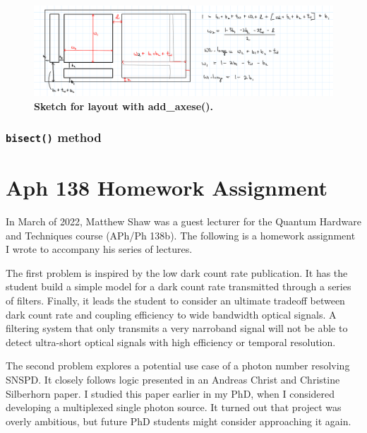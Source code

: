 \documentclass[11pt]{caltech_thesis} %
\begin{document}
\hypertarget{fig:layout_sketch}{%
\begin{figure}
\centering
\includegraphics{chapter_05/figs_05/layout_sketch.png}
\caption[{Rough sketch for layout with add\_axese()}]{\textbf{Sketch for
layout with add\_axese().}}
\label{fig:layout_sketch}
\end{figure}
}

\hypertarget{bisect-method}{%
\subsubsection{\texorpdfstring{\texttt{bisect()}
method}{bisect() method}}\label{bisect-method}}

\hypertarget{aph-138-homework-assignment}{%
\section{Aph 138 Homework
Assignment}\label{aph-138-homework-assignment}}

In March of 2022, Matthew Shaw was a guest lecturer for the Quantum
Hardware and Techniques course (APh/Ph 138b). The following is a
homework assignment I wrote to accompany his series of lectures.

The first problem is inspired by the low dark count rate
publication\autocite{Mueller:21}. It has the student build a simple
model for a dark count rate transmitted through a series of filters.
Finally, it leads the student to consider an ultimate tradeoff between
dark count rate and coupling efficiency to wide bandwidth optical
signals. A filtering system that only transmits a very narroband signal
will not be able to detect ultra-short optical signals with high
efficiency or temporal resolution.

The second problem explores a potential use case of a photon number
resolving SNSPD. It closely follows logic presented in an Andreas Christ
and Christine Silberhorn paper\autocite{Andreas:12}. I studied this
paper earlier in my PhD, when I considered developing a multiplexed
single photon source. It turned out that project was overly ambitious,
but future PhD students might consider approaching it again.
\end{document}
